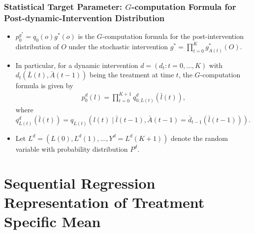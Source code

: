 \documentclass[t]{beamer}
\begin{document}
\begin{frame}
\frametitle{Statistical Target Parameter: $G$-computation Formula for Post-dynamic-Intervention Distribution}
\begin{itemize}
\item $p^{g^*}_0=q_0(o)g^*(o)$ is the $G$-computation formula for the post-intervention distribution of $O$ under the stochastic intervention $g^*=\prod_{t=0}^K g^*_{A(t)}(O)$.
\item
In particular, for a dynamic intervention $d=(d_t: t=0,\ldots,K)$ with $d_t(\bar{L}(t),\bar{A}(t-1))$ being the treatment at time $t$, the $G$-computation formula is given by \begin{align}
\label{eqn:Gcomp}
p^d_0(l)=\prod_{t=0}^{K+1}q_{0,L(t)}^d(\bar{l}(t)),
\end{align}
where $q_{L(t)}^d(\bar{l}(t))=q_{L(t)}(l(t)\mid \bar{l}(t-1),\bar{A}(t-1)=\bar{d}_{t-1}(\bar{l}(t-1)) )$. 
\item
Let $L^d=(L(0),L^d(1),\ldots,Y^d=L^d(K+1))$ denote the random variable with probability distribution $P^d$. 
\end{itemize}
\end{frame}

\section{Sequential Regression Representation of Treatment Specific Mean}
\end{document}
